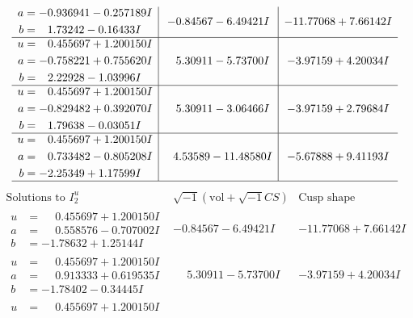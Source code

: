 \documentclass[1p]{elsarticle_modified}
\theoremstyle{definition}
\newcommand{\I}{\sqrt{-1}}
\begin{document}
$$\begin{array}{c|c|c}
\begin{aligned}
a &= -0.936941 - 0.257189 I \\
b &= \phantom{-}1.73242 - 0.16433 I\end{aligned}
 & -0.84567 - 6.49421 I & -11.77068 + 7.66142 I \\ \hline\begin{aligned}
u &= \phantom{-}0.455697 + 1.200150 I \\
a &= -0.758221 + 0.755620 I \\
b &= \phantom{-}2.22928 - 1.03996 I\end{aligned}
 & \phantom{-}5.30911 - 5.73700 I & -3.97159 + 4.20034 I \\ \hline\begin{aligned}
u &= \phantom{-}0.455697 + 1.200150 I \\
a &= -0.829482 + 0.392070 I \\
b &= \phantom{-}1.79638 - 0.03051 I\end{aligned}
 & \phantom{-}5.30911 - 3.06466 I & -3.97159 + 2.79684 I \\ \hline\begin{aligned}
u &= \phantom{-}0.455697 + 1.200150 I \\
a &= \phantom{-}0.733482 - 0.805208 I \\
b &= -2.25349 + 1.17599 I\end{aligned}
 & \phantom{-}4.53589 - 11.48580 I & -5.67888 + 9.41193 I\\
 \hline 
 \end{array}$$\newpage$$\begin{array}{c|c|c}  
\text{Solutions to }I^u_{2}& \I (\text{vol} + \sqrt{-1}CS) & \text{Cusp shape}\\
 \hline 
\begin{aligned}
u &= \phantom{-}0.455697 + 1.200150 I \\
a &= \phantom{-}0.558576 - 0.707002 I \\
b &= -1.78632 + 1.25144 I\end{aligned}
 & -0.84567 - 6.49421 I & -11.77068 + 7.66142 I \\ \hline\begin{aligned}
u &= \phantom{-}0.455697 + 1.200150 I \\
a &= \phantom{-}0.913333 + 0.619535 I \\
b &= -1.78402 - 0.34445 I\end{aligned}
 & \phantom{-}5.30911 - 5.73700 I & -3.97159 + 4.20034 I \\ \hline\begin{aligned}
u &= \phantom{-}0.455697 + 1.200150 I \\

\end{aligned}
\end{array}$$
\end{document}
